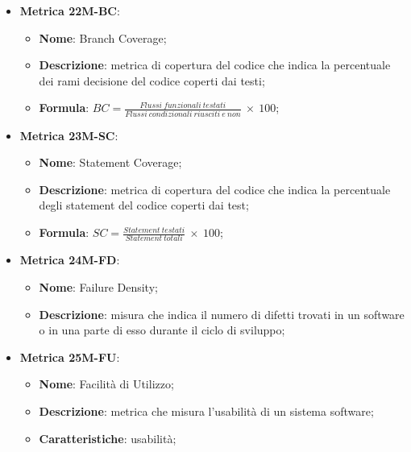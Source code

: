 \begin{itemize}
    \item \textbf{Metrica 22M-BC}:
    \begin{itemize}
        \item \textbf{Nome}: Branch Coverage;
        \item \textbf{Descrizione}: metrica di copertura del codice che indica la percentuale dei rami decisione del codice coperti dai testi;
        \item \textbf{Formula}: $BC =\frac{Flussi\:funzionali\: testati}{Flussi\:condizionali\: riusciti\: e\: non}\: \times \: 100$;
    \end{itemize}
\end{itemize}

\begin{itemize}
    \item \textbf{Metrica 23M-SC}:
    \begin{itemize}
        \item \textbf{Nome}: Statement Coverage;
        \item \textbf{Descrizione}: metrica di copertura del codice che indica la percentuale degli statement del codice coperti dai test;
        \item \textbf{Formula}: $SC = \frac{Statement\: testati}{Statement\: totali}\: \times \: 100$;
    \end{itemize}
\end{itemize}

\begin{itemize}
    \item \textbf{Metrica 24M-FD}:
    \begin{itemize}
        \item \textbf{Nome}: Failure Density;
        \item \textbf{Descrizione}: misura che indica il numero di difetti trovati in un software o in una parte di esso durante il ciclo di sviluppo;
    \end{itemize}
\end{itemize}

\begin{itemize}
    \item \textbf{Metrica 25M-FU}:
    \begin{itemize}
        \item \textbf{Nome}: Facilità di Utilizzo;
        \item \textbf{Descrizione}: metrica che misura l'usabilità di un sistema software;
        \item \textbf{Caratteristiche}: usabilità;
    \end{itemize}
\end{itemize}

